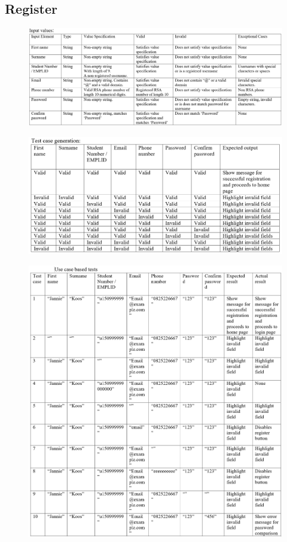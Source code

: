 \documentclass[english]{article}
\begin{document}
\subsection{Register}
\begin{figure}[H]
    \label{tab:example}
\hspace*{-2.5cm}
\includegraphics[width=180mm]{5.png}
\end{figure}
\begin{figure}[H]
\hspace*{-2.5cm}
\includegraphics[width=180mm]{6.png}
\end{figure}
\begin{figure}[H]
\hspace*{-2.5cm}
\includegraphics[width=180mm]{7.png}
\end{figure}
\end{document}
